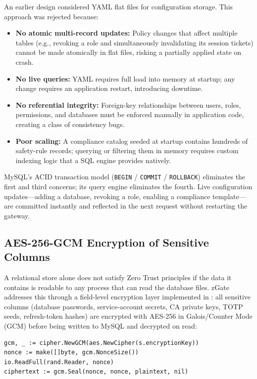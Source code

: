 An earlier design considered YAML flat files for configuration storage. This approach was rejected because:

\begin{itemize}
    \item \textbf{No atomic multi-record updates:} Policy changes that affect multiple tables (e.g., revoking a role and simultaneously invalidating its session tickets) cannot be made atomically in flat files, risking a partially applied state on crash.
    \item \textbf{No live queries:} YAML requires full load into memory at startup; any change requires an application restart, introducing downtime.
    \item \textbf{No referential integrity:} Foreign-key relationships between users, roles, permissions, and databases must be enforced manually in application code, creating a class of consistency bugs.
    \item \textbf{Poor scaling:} A compliance catalog seeded at startup contains hundreds of safety-rule records; querying or filtering them in memory requires custom indexing logic that a SQL engine provides natively.
\end{itemize}

MySQL's ACID transaction model (\texttt{BEGIN} / \texttt{COMMIT} / \texttt{ROLLBACK}) eliminates the first and third concerns; its query engine eliminates the fourth. Live configuration updates---adding a database, revoking a role, enabling a compliance template---are committed instantly and reflected in the next request without restarting the gateway.

\subsection{AES-256-GCM Encryption of Sensitive Columns}

A relational store alone does not satisfy Zero Trust principles if the data it contains is readable to any process that can read the database files. zGate addresses this through a field-level encryption layer implemented in : all sensitive columns (database passwords, service-account secrets, CA private keys, TOTP seeds, refresh-token hashes) are encrypted with AES-256 in Galois/Counter Mode (GCM) before being written to MySQL and decrypted on read:

\begin{verbatim}
gcm, _ := cipher.NewGCM(aes.NewCipher(s.encryptionKey))
nonce := make([]byte, gcm.NonceSize())
io.ReadFull(rand.Reader, nonce)
ciphertext := gcm.Seal(nonce, nonce, plaintext, nil)
\end{verbatim}

